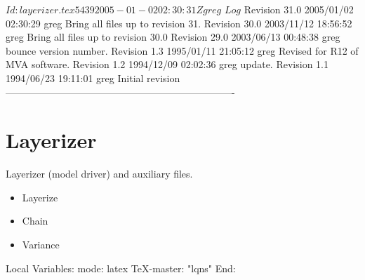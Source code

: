 \C 
\C $Id: layerizer.tex 5439 2005-01-02 02:30:31Z greg $
\C 
\C $Log$
\C Revision 31.0  2005/01/02 02:30:29  greg
\C Bring all files up to revision 31.
\C
\C Revision 30.0  2003/11/12 18:56:52  greg
\C Bring all files up to revision 30.0
\C
\C Revision 29.0  2003/06/13 00:48:38  greg
\C bounce version number.
\C
\C Revision 1.3  1995/01/11 21:05:12  greg
\C Revised for R12 of MVA software.
\C
\C Revision 1.2  1994/12/09  02:02:36  greg
\C update.
\C
\C Revision 1.1  1994/06/23  19:11:01  greg
\C Initial revision
\C
\C ----------------------------------------------------------------------
\chapter{Layerizer}

Layerizer (model driver) and auxiliary files.

\begin{iftex}
\begin{itemize}
\item Layerize
\item Chain
\item Variance
\end{itemize}
\end{iftex}




\C Local Variables: 
\C mode: latex
\C TeX-master: "lqns"
\C End: 
